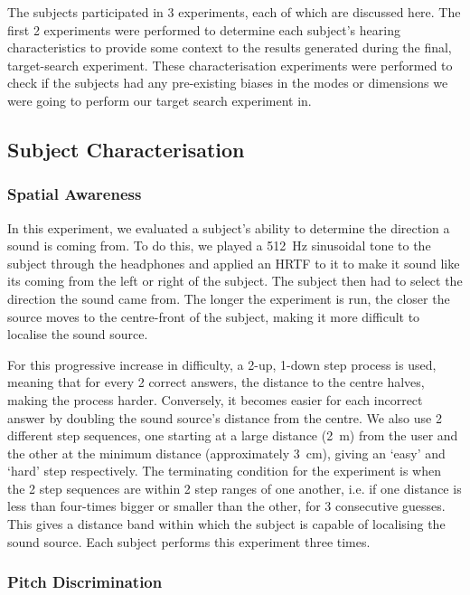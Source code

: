 \documentclass[format=sigconf, review=true, screen=true, anonymous=true]{acmart}
\begin{document}
The subjects participated in 3 experiments, each of which are discussed here. The first 2 experiments were performed to determine each subject's hearing characteristics to provide some context to the results generated during the final, target-search experiment. These characterisation experiments were performed to check if the subjects had any pre-existing biases in the modes or dimensions we were going to perform our target search experiment in. 

\subsection{Subject Characterisation}

\subsubsection{Spatial Awareness}

In this experiment, we evaluated a subject's ability to determine the direction a sound is coming from. To do this, we played a \SI{512}{\hertz} sinusoidal tone to the subject through the headphones and applied an HRTF to it to make it sound like its coming from the left or right of the subject. The subject then had to select the direction the sound came from. The longer the experiment is run, the closer the source moves to the centre-front of the subject, making it more difficult to localise the sound source. 

For this progressive increase in difficulty, a 2-up, 1-down step process is used, meaning that for every 2 correct answers, the distance to the centre halves, making the process harder. Conversely, it becomes easier for each incorrect answer by doubling the sound source's distance from the centre. We also use 2 different step sequences, one starting at a large distance (\SI{2}{\m}) from the user and the other at the minimum distance (approximately \SI{3}{\cm}), giving an `easy' and `hard' step respectively. The terminating condition for the experiment is when the 2 step sequences are within 2 step ranges of one another, i.e. if one distance is less than four-times bigger or smaller than the other, for 3 consecutive guesses. This gives a distance band within which the subject is capable of localising the sound source. Each subject performs this experiment three times. 

\subsubsection{Pitch Discrimination}
\end{document}
